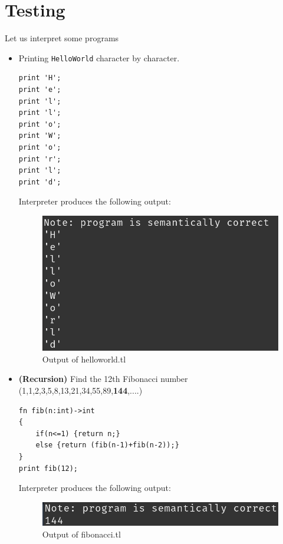 \section{Testing}
Let us interpret some programs
\begin{itemize}
	\item Printing \verb!HelloWorld! character by character.
	      \begin{lstlisting}[basicstyle=\tiny,caption=helloworld.tl]
print 'H';
print 'e';
print 'l';
print 'l';
print 'o';
print 'W';
print 'o';
print 'r';
print 'l';
print 'd';
	      \end{lstlisting}
	      Interpreter produces the following output:
	      \begin{figure}[H]
	      	\centering
	      	\includegraphics[scale=0.8]{Task345/images/helloworld.png}
	      	\caption{Output of helloworld.tl}
	      	\label{fig:output helloworld}
	      \end{figure}
	\item \textbf{(Recursion)} Find the 12th Fibonacci number (1,1,2,3,5,8,13,21,34,55,89,\textbf{144},....)  
	      \begin{lstlisting}[basicstyle=\tiny,caption=fibonacci.tl]
fn fib(n:int)->int
{
	if(n<=1) {return n;}
	else {return (fib(n-1)+fib(n-2));}
}
print fib(12);
	      \end{lstlisting}
	      Interpreter produces the following output:
	      \begin{figure}[H]
	      	\centering
	      	\includegraphics[scale=0.8]{Task345/images/fib.png}
	      	\caption{Output of fibonacci.tl}
	      	\label{fig:output fibonacci}
	      \end{figure}

\end{itemize}
